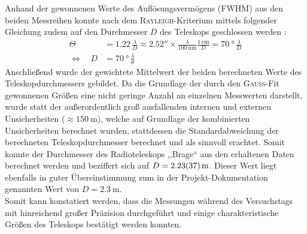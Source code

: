     Anhand der gewonnenen Werte des Auflösungsvermögens (FWHM) aus den beiden Messreihen konnte nach dem \textsc{Rayleigh}-Kriterium mittels folgender Gleichung zudem auf den Durchmesser $D$ des Teleskops geschlossen werden \cite{Karttunen2013}:
    \begin{align}
        \Theta &= 1.22 \, \frac{\lambda}{D} \approx \ang{;;2.52} \times \frac{\lambda}{\SI{100}{\nano \metre}} \frac{\SI{1}{\centi \metre}}{D} = \SI{70}{\degree} \, \frac{\lambda}{D}\\
        \Leftrightarrow \quad D &= \SI{70}{\degree} \, \frac{\lambda}{\theta}
    \end{align}
    Anschließend wurde der gewichtete Mittelwert der beiden berechneten Werte des Teleskopdurchmessers gebildet. Da die Grundlage der durch den \textsc{Gauß}-Fit gewonnenen Größen eine nicht geringe Anzahl an einzelnen Messwerten darstellt, wurde statt der außerordentlich groß ausfallenden internen und externen Unsicherheiten ($\approx \SI{150}{\metre}$), welche auf Grundlage der kombinierten Unsicherheiten berechnet wurden, stattdessen die Standardabweichung der berechneten Teleskopdurchmesser berechnet und als sinnvoll erachtet. Somit konnte der Durchmesser des Radioteleskops ,,Brage`` aus den erhaltenen Daten berechnet werden und beziffert sich auf $D = \SI{2.23 \pm 0.37}{\metre}$. Dieser Wert liegt ebenfalls in guter Übereinstimmung zum in der Projekt-Dokumentation \cite{Usermanual} genannten Wert von $D = \SI{2.3}{\metre}$. \\    
    
    Somit kann konstatiert werden, dass die Messungen während des Versuchstags mit hinreichend großer Präzision durchgeführt und einige charakteristische Größen des Teleskops bestätigt werden konnten.